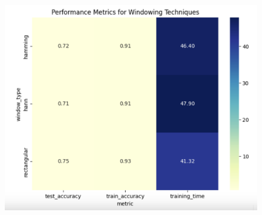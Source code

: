 \documentclass[a4paper,12pt]{article}
\begin{document}
            \begin{figure}[H]
                \centering
                \includegraphics[width=1\linewidth]{PerformanceMetricsWindowing.png}
            \end{figure}
\end{document}
